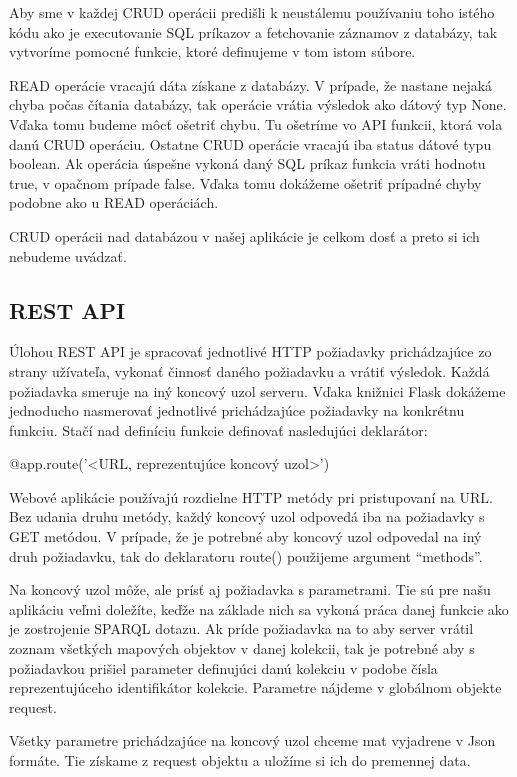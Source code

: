 Aby sme v každej CRUD operácii predišli k neustálemu používaniu toho istého kódu ako je executovanie SQL príkazov a fetchovanie záznamov z databázy, 
tak vytvoríme pomocné funkcie, ktoré definujeme v tom istom súbore. 

READ operácie vracajú dáta získane z databázy. V prípade, že nastane nejaká chyba počas čítania databázy, tak operácie vrátia výsledok ako dátový typ None. Vďaka tomu budeme môcť ošetriť chybu. Tu ošetríme vo API funkcii, ktorá vola danú CRUD operáciu. 
Ostatne CRUD operácie vracajú iba status dátové typu boolean. Ak operácia úspešne vykoná daný SQL príkaz funkcia vráti hodnotu true, v opačnom prípade false. Vďaka tomu dokážeme 
ošetriť prípadné chyby podobne ako u READ operáciách. 

CRUD operácii nad databázou v našej aplikácie je celkom dosť a preto si ich nebudeme uvádzať. 

\subsection{REST API}
Úlohou REST API je spracovať jednotlivé HTTP požiadavky prichádzajúce zo strany užívateľa, vykonať činnosť daného požiadavku a vrátiť výsledok. 
Každá požiadavka smeruje na iný koncový uzol serveru. Vďaka knižnici Flask dokážeme jednoducho nasmerovať jednotlivé prichádzajúce požiadavky na konkrétnu funkciu. 
Stačí nad definíciu funkcie definovať nasledujúci deklarátor: 
\begin{code}
      @app.route('<URL, reprezentujúce koncový uzol>')
\end{code}

Webové aplikácie používajú rozdielne HTTP metódy pri pristupovaní na URL. Bez udania druhu metódy, každý koncový uzol odpovedá iba na požiadavky s GET metódou. 
V prípade, že je potrebné aby koncový uzol odpovedal na iný druh požiadavku, tak do deklaratoru route() použijeme argument “methods”. 

Na koncový uzol môže, ale prísť aj požiadavka s parametrami. Tie sú pre našu aplikáciu veľmi doležíte, keďže na základe nich sa vykoná práca danej funkcie ako je zostrojenie SPARQL dotazu. Ak príde požiadavka na to aby server vrátil 
zoznam všetkých mapových objektov v danej kolekcii, tak je potrebné aby s požiadavkou prišiel parameter definujúci danú kolekciu v podobe čísla reprezentujúceho identifikátor kolekcie. 
Parametre nájdeme v globálnom objekte request. 

Všetky parametre prichádzajúce na koncový uzol chceme mat vyjadrene v Json formáte. Tie získame z request objektu a uložíme si ich do premennej data. 

